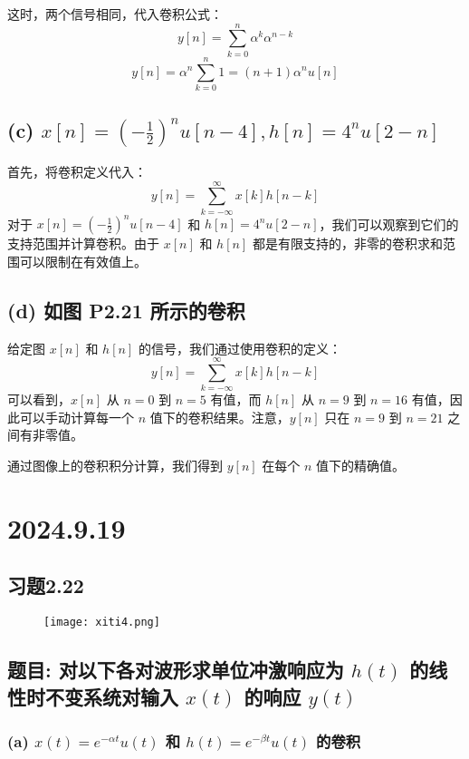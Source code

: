 \documentclass[UTF8]{report}
\theoremstyle{MyLineTheoremStyle} %
\theoremstyle{MyBlockTheoremStyle} %
\theoremstyle{MySubsubsectionStyle} %
\begin{document}
这时，两个信号相同，代入卷积公式：
\[
y[n] = \sum_{k=0}^{n} \alpha^k \alpha^{n-k}
\]
\[
y[n] = \alpha^n \sum_{k=0}^{n} 1 = (n+1)\alpha^n u[n]
\]

\section*{(c) $x[n] = \left( -\frac{1}{2} \right)^n u[n-4], h[n] = 4^n u[2-n]$}

首先，将卷积定义代入：
\[
y[n] = \sum_{k=-\infty}^{\infty} x[k] h[n-k]
\]
对于 $x[n] = \left( -\frac{1}{2} \right)^n u[n-4]$ 和 $h[n] = 4^n u[2-n]$，我们可以观察到它们的支持范围并计算卷积。由于 $x[n]$ 和 $h[n]$ 都是有限支持的，非零的卷积求和范围可以限制在有效值上。

\section*{(d) 如图 P2.21 所示的卷积}

给定图 $x[n]$ 和 $h[n]$ 的信号，我们通过使用卷积的定义：
\[
y[n] = \sum_{k=-\infty}^{\infty} x[k] h[n-k]
\]
可以看到，$x[n]$ 从 $n = 0$ 到 $n = 5$ 有值，而 $h[n]$ 从 $n = 9$ 到 $n = 16$ 有值，因此可以手动计算每一个 $n$ 值下的卷积结果。注意，$y[n]$ 只在 $n = 9$ 到 $n = 21$ 之间有非零值。

通过图像上的卷积积分计算，我们得到 $y[n]$ 在每个 $n$ 值下的精确值。



\chapter{2024.9.19}\thispagestyle{fancy}

\section{习题2.22}
\begin{figure}[ht]
    \centering
    \texttt{[image: xiti4.png]}
\end{figure}

\section*{题目: 对以下各对波形求单位冲激响应为 $h(t)$ 的线性时不变系统对输入 $x(t)$ 的响应 $y(t)$}

\subsection*{(a) $x(t) = e^{-\alpha t} u(t)$ 和 $h(t) = e^{-\beta t} u(t)$ 的卷积}
\end{document}
